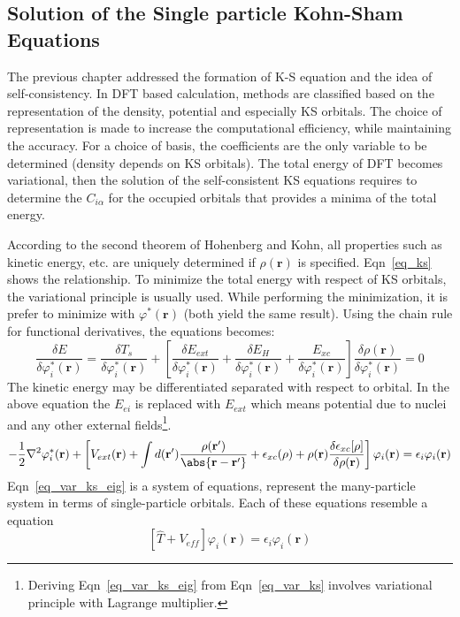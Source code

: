 \subsection{Solution of the Single particle Kohn-Sham Equations}
The previous chapter addressed the formation of K-S equation and the idea of self-consistency. In DFT based calculation, methods are classified based on the representation of the density, potential and especially KS orbitals. The choice of representation is made to increase the computational efficiency, while maintaining the accuracy.
For a choice of basis, the coefficients are the only variable to be determined (density depends on KS orbitals). The total energy of DFT becomes variational, then the solution of the self-consistent KS equations requires to determine the $C_{i\alpha}$ for the occupied orbitals that provides a minima of the total energy.

According to the second theorem of Hohenberg and Kohn, all properties such as kinetic energy, etc. are uniquely determined if $\rho(\mathbf{r})$ is specified. Eqn~\ref{eq_ks} shows the relationship. To minimize the total energy with respect of KS orbitals, the variational principle is usually used. While performing the minimization, it is prefer to minimize with $\varphi^{\ast}(\mathbf{r})$ (both yield the same result). Using the chain rule for functional derivatives, the equations becomes:
\begin{equation}
\label{eq_var_ks}
\frac{\delta E}{\delta \varphi^{\ast}_i(\mathbf{r})} = \frac{\delta T_s}{\delta \varphi^{\ast}_i(\mathbf{r})} + \left [ \frac{\delta E_{ext}}{\delta \varphi^{\ast}_i(\mathbf{r})} + \frac{\delta E_H}{\delta \varphi^{\ast}_i(\mathbf{r})} + \frac{E_{xc}}{\delta \varphi^{\ast}_i(\mathbf{r})}	\right ] \frac{\delta \rho(\mathbf{r})}{\delta \varphi^{\ast}_i(\mathbf{r})}  = 0
\end{equation}
The kinetic energy may be differentiated separated with respect to orbital. In the above equation the $E_{ei}$ is replaced with $E_{ext}$ which means potential due to nuclei and any other external fields\footnote{Deriving Eqn~\ref{eq_var_ks_eig} from Eqn~\ref{eq_var_ks} involves variational principle with Lagrange multiplier.}.
\begin{equation}
\label{eq_var_ks_eig}
-\frac{1}{2} \nabla^2 \varphi^{\ast}_i (\mathbf{r}) + \left [ V_{ext} (\mathbf{r}) + \int d(\mathbf{r'}) \frac{\rho(\mathbf{r'})}{\abs{\mathbf{r}-\mathbf{r'}}} + \epsilon_{xc} (\rho) + \rho(\mathbf{r}) \frac{\delta \epsilon_{xc}[\rho]}{\delta \rho(\mathbf{r})}   \right ] \varphi_i(\mathbf{r})  = \epsilon_i \varphi_i (\mathbf{r})
\end{equation}
Eqn~\ref{eq_var_ks_eig} is a system of equations, represent the many-particle system in terms of single-particle orbitals. Each of these equations resemble a \schrod equation
\begin{equation}
\label{eq_ks_s}
\left [ \hat{T} + V_{eff}\right ] \varphi_i (\mathbf{r}) = \epsilon_i \varphi_i (\mathbf{r})
\end{equation}

